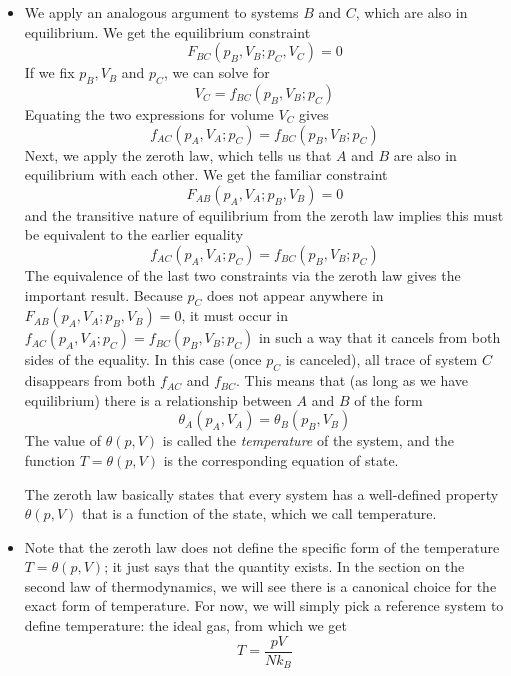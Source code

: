 \documentclass[11pt, a4paper]{article}
\begin{document}
\begin{itemize}
	\item We apply an analogous argument to systems $ B $ and $ C $, which are also in equilibrium. We get the equilibrium constraint
	\begin{equation*}
		F_{BC}(p_{B}, V_{B}; p_{C}, V_{C}) = 0
	\end{equation*}
	If we fix $ p_{B}, V_{B} $ and $ p_{C} $, we can solve for
	\begin{equation*}
		V_{C} = f_{BC}(p_{B}, V_{B}; p_{C})
	\end{equation*}
	Equating the two expressions for volume $ V_{C} $ gives
	\begin{equation*}
		f_{AC}(p_{A}, V_{A}; p_{C}) = f_{BC}(p_{B}, V_{B}; p_{C})
	\end{equation*}
	Next, we apply the zeroth law, which tells us that $ A $ and $ B $ are also in equilibrium with each other. We get the familiar constraint
	\begin{equation*}
		F_{AB}(p_{A}, V_{A}; p_{B}, V_{B}) = 0
	\end{equation*}
	and the transitive nature of equilibrium from the zeroth law implies this must be equivalent to the earlier equality
	\begin{equation*}
		f_{AC}(p_{A}, V_{A}; p_{C}) = f_{BC}(p_{B}, V_{B}; p_{C})
	\end{equation*}
	The equivalence of the last two constraints via the zeroth law gives the important result. Because $ p_{C} $ does not appear anywhere in $ F_{AB}(p_{A}, V_{A}; p_{B}, V_{B}) = 0 $, it must occur in $ f_{AC}(p_{A}, V_{A}; p_{C}) = f_{BC}(p_{B}, V_{B}; p_{C}) $ in such a way that it cancels from both sides of the equality. In this case (once $ p_{C} $ is canceled), all trace of system $ C $ disappears from both $ f_{AC} $ and $ f_{BC} $. This means that (as long as we have equilibrium) there is a relationship between $ A $ and $ B $ of the form
	\begin{equation*}
		\theta_{A}(p_{A}, V_{A}) = \theta_{B}(p_{B}, V_{B})
	\end{equation*}
	The value of $ \theta(p, V) $ is called the \textit{temperature} of the system, and the function $ T = \theta(p, V) $ is the corresponding equation of state.
	
	The zeroth law basically states that every system has a well-defined property $ \theta(p, V) $ that is a function of the state, which we call temperature.
	
	\item Note that the zeroth law does not define the specific form of the temperature $ T = \theta(p, V) $; it just says that the quantity exists. In the section on the second law of thermodynamics, we will see there is a canonical choice for the exact form of temperature. For now, we will simply pick a reference system to define temperature: the ideal gas, from which we get
	\begin{equation*}
		T = \frac{pV}{Nk_{B}}
	\end{equation*}
\end{itemize}
\end{document}
